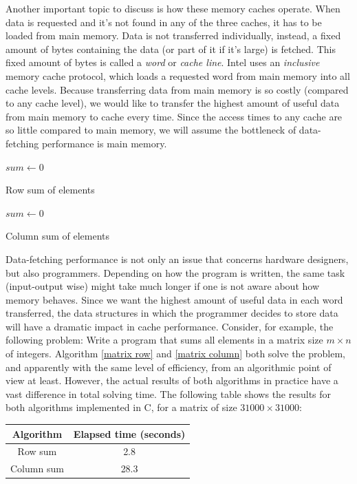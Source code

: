 \documentclass[12pt]{diicc}
\begin{document}
Another important topic to discuss is how these memory caches operate. When data is requested and it's not found in any of the three caches, it has to be loaded from main memory. Data is not transferred individually, instead, a fixed amount of bytes containing the data (or part of it if it's large) is fetched. This fixed amount of bytes is called a \textit{word} or \textit{cache line}. Intel uses an \textit{inclusive} memory cache protocol, which loads a requested word from main memory into all cache levels. 
Because transferring data from main memory is so costly (compared to any cache level), we would like to transfer the highest amount of useful data from main memory to cache every time. Since the access times to any cache are so little compared to main memory, we will assume the bottleneck of data-fetching performance is main memory. 

\begin{algorithm}
$sum \leftarrow 0$ \\
\caption{Row sum of elements\label{matrix row}}
\end{algorithm}

\begin{algorithm}
$sum \leftarrow 0$ \\
\caption{Column sum of elements\label{matrix column}}
\end{algorithm}

Data-fetching performance is not only an issue that concerns hardware designers, but also programmers. Depending on how the program is written, the same task (input-output wise) might take much longer if one is not aware about how memory behaves. Since we want the highest amount of useful data in each word transferred, the data structures in which the programmer decides to store data will have a dramatic impact in cache performance. Consider, for example, the following problem: Write a program that sums all elements in a matrix size $m \times n$ of integers. Algorithm \ref{matrix row} and \ref{matrix column} both solve the problem, and apparently with the same level of efficiency, from an algorithmic point of view at least. However, the actual results of both algorithms in practice have a vast difference in total solving time. The following table shows the results for both algorithms implemented in C, for a matrix of size $31000 \times 31000$:
\begin{center}
\begin{tabular}{ c | c }
  Algorithm & Elapsed time (seconds) \\ \hline
  Row sum & 2.8 \\
  Column sum & 28.3 \\ 
\end{tabular}
\end{center}
\end{document}
